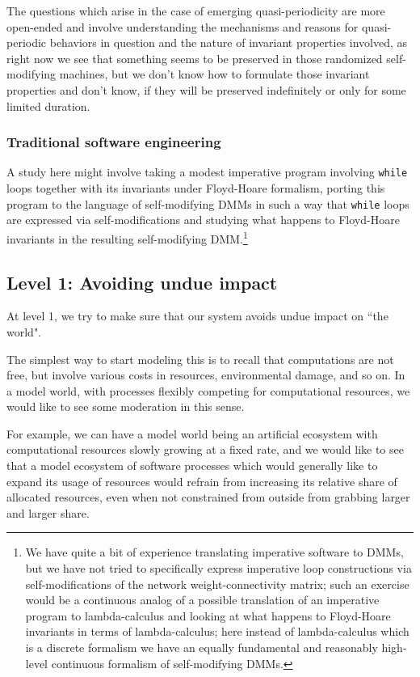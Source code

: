 \documentclass{article}
\begin{document}
The questions which arise in the case of emerging quasi-periodicity are more open-ended
and involve understanding the mechanisms and reasons for quasi-periodic behaviors in question
and the nature of invariant properties involved, as right now we see that something seems to be 
preserved in those randomized self-modifying machines, but we don't know how to formulate
those invariant properties and don't know, if they will be preserved indefinitely or only for
some limited duration.

\subsubsection{Traditional software engineering}

A study here might involve taking a modest imperative program involving {\tt while} loops together
with its invariants under Floyd-Hoare formalism, porting this program to the language of
self-modifying DMMs in such a way that {\tt while} loops are expressed via self-modifications
and studying what happens to Floyd-Hoare invariants in the resulting self-modifying DMM.\footnote{We have quite a bit
of experience translating imperative software to DMMs, but we have not tried to specifically express imperative loop constructions
via self-modifications of the network weight-connectivity matrix; such an exercise would be a continuous analog of a possible
translation of an imperative program to lambda-calculus and looking at what happens to Floyd-Hoare
invariants in terms of lambda-calculus; here instead of lambda-calculus which is a discrete formalism
we have an equally fundamental and reasonably high-level continuous formalism of self-modifying DMMs.}

\subsection{Level 1: Avoiding undue impact}

At level 1, we try to make sure that our system avoids undue impact on ``the world".

The simplest way to start modeling this is to recall that computations are not free, but involve
various costs in resources, environmental damage, and so on. In a model world, with processes
flexibly competing for computational resources, we would like to see some moderation in this sense.

For example, we can have a model world being an artificial ecosystem with computational resources
slowly growing at a fixed rate, and we would like to see that a model ecosystem of software processes
which would generally like to expand its usage of resources would refrain from increasing its
relative share of allocated resources, even when not constrained from outside from grabbing larger and larger share.
\end{document}
